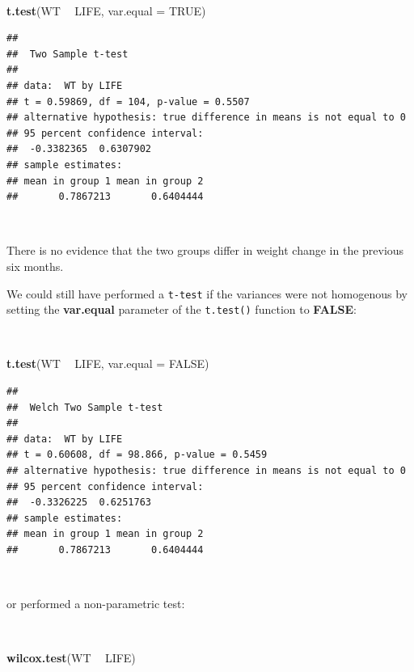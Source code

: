 \documentclass[12pt,a4paper]{book}
\newenvironment{Shaded}{\begin{snugshade}}{\end{snugshade}}
\newcommand{\KeywordTok}[1]{\textcolor[rgb]{0.13,0.29,0.53}{\textbf{#1}}}
\newcommand{\DataTypeTok}[1]{\textcolor[rgb]{0.13,0.29,0.53}{#1}}
\newcommand{\StringTok}[1]{\textcolor[rgb]{0.31,0.60,0.02}{#1}}
\newcommand{\OtherTok}[1]{\textcolor[rgb]{0.56,0.35,0.01}{#1}}
\newcommand{\OperatorTok}[1]{\textcolor[rgb]{0.81,0.36,0.00}{\textbf{#1}}}
\newcommand{\NormalTok}[1]{#1}
\theoremstyle{definition}
\theoremstyle{definition}
\theoremstyle{definition}
\theoremstyle{remark}
\begin{document}
~

\begin{Shaded}
\begin{Highlighting}[]
\KeywordTok{t.test}\NormalTok{(WT }\OperatorTok{~}\StringTok{ }\NormalTok{LIFE, }\DataTypeTok{var.equal =} \OtherTok{TRUE}\NormalTok{)}
\end{Highlighting}
\end{Shaded}

\begin{verbatim}
## 
##  Two Sample t-test
## 
## data:  WT by LIFE
## t = 0.59869, df = 104, p-value = 0.5507
## alternative hypothesis: true difference in means is not equal to 0
## 95 percent confidence interval:
##  -0.3382365  0.6307902
## sample estimates:
## mean in group 1 mean in group 2 
##       0.7867213       0.6404444
\end{verbatim}

~

There is no evidence that the two groups differ in weight change in the
previous six months.

We could still have performed a \texttt{t-test} if the variances were
not homogenous by setting the \textbf{var.equal} parameter of the
\texttt{t.test()} function to \textbf{FALSE}:

~

\begin{Shaded}
\begin{Highlighting}[]
\KeywordTok{t.test}\NormalTok{(WT }\OperatorTok{~}\StringTok{ }\NormalTok{LIFE, }\DataTypeTok{var.equal =} \OtherTok{FALSE}\NormalTok{)}
\end{Highlighting}
\end{Shaded}

\begin{verbatim}
## 
##  Welch Two Sample t-test
## 
## data:  WT by LIFE
## t = 0.60608, df = 98.866, p-value = 0.5459
## alternative hypothesis: true difference in means is not equal to 0
## 95 percent confidence interval:
##  -0.3326225  0.6251763
## sample estimates:
## mean in group 1 mean in group 2 
##       0.7867213       0.6404444
\end{verbatim}

~

or performed a non-parametric test:

~

\begin{Shaded}
\begin{Highlighting}[]
\KeywordTok{wilcox.test}\NormalTok{(WT }\OperatorTok{~}\StringTok{ }\NormalTok{LIFE)}
\end{Highlighting}
\end{Shaded}
\end{document}
